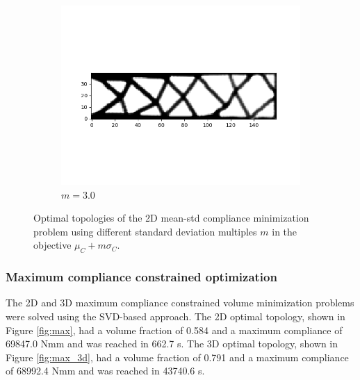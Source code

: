 \begin{figure}
\begin{subfigure}[t]{0.45\textwidth}
          \includegraphics[width=1\textwidth]{./images/robust_exact/exact_svd_mean_30std_csimp.png}
          \caption{$m = 3.0$}
        \end{subfigure}
        \caption{Optimal topologies of the 2D mean-std compliance minimization problem using different standard deviation multiples $m$ in the objective $\mu_C + m \sigma_C$.}
        \label{fig:mean_m_std_2d}
      \end{figure}

    \subsubsection{Maximum compliance constrained optimization}

      The 2D and 3D maximum compliance constrained volume minimization problems were solved using the SVD-based approach. The 2D optimal topology, shown in Figure \ref{fig:max}, had a volume fraction of 0.584 and a maximum compliance of 69847.0 Nmm and was reached in 662.7 s. The 3D optimal topology, shown in Figure \ref{fig:max_3d}, had a volume fraction of 0.791 and a maximum compliance of 68992.4 Nmm and was reached in 43740.6 s.

